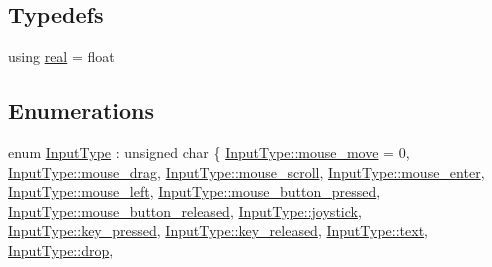 \subsection*{Typedefs}
\begin{DoxyCompactItemize}
\item 
using \mbox{\hyperlink{namespacengl_adada767537188ac7e090781732167146}{real}} = float
\end{DoxyCompactItemize}
\subsection*{Enumerations}
\begin{DoxyCompactItemize}
\item 
enum \mbox{\hyperlink{namespacengl_a5b20ff50635da5e3adb6bec00c062497}{Input\+Type}} \+: unsigned char \{ \newline
\mbox{\hyperlink{namespacengl_a5b20ff50635da5e3adb6bec00c062497a03f85558f24cc469dac5df2fdc8fd117}{Input\+Type\+::mouse\+\_\+move}} = 0, 
\mbox{\hyperlink{namespacengl_a5b20ff50635da5e3adb6bec00c062497a0442427b92526e865f90827173e346a0}{Input\+Type\+::mouse\+\_\+drag}}, 
\mbox{\hyperlink{namespacengl_a5b20ff50635da5e3adb6bec00c062497a6fda8ddfe16d2314d571fd69f5d5e9ff}{Input\+Type\+::mouse\+\_\+scroll}}, 
\mbox{\hyperlink{namespacengl_a5b20ff50635da5e3adb6bec00c062497a41bc07e96e66c3decc6bcb84741efbd2}{Input\+Type\+::mouse\+\_\+enter}}, 
\newline
\mbox{\hyperlink{namespacengl_a5b20ff50635da5e3adb6bec00c062497a88ad28b301ac29cf34aa69a9ff8dd4c8}{Input\+Type\+::mouse\+\_\+left}}, 
\mbox{\hyperlink{namespacengl_a5b20ff50635da5e3adb6bec00c062497a8285417800ef72bf8102466fe9e71cff}{Input\+Type\+::mouse\+\_\+button\+\_\+pressed}}, 
\mbox{\hyperlink{namespacengl_a5b20ff50635da5e3adb6bec00c062497aacdcff0ecfa7718eae6d7a9cb79f060d}{Input\+Type\+::mouse\+\_\+button\+\_\+released}}, 
\mbox{\hyperlink{namespacengl_a5b20ff50635da5e3adb6bec00c062497a2ed69833bf8cb33c80eaf0daa892400e}{Input\+Type\+::joystick}}, 
\newline
\mbox{\hyperlink{namespacengl_a5b20ff50635da5e3adb6bec00c062497ae394504187ed264fde32ad8f24ad7fba}{Input\+Type\+::key\+\_\+pressed}}, 
\mbox{\hyperlink{namespacengl_a5b20ff50635da5e3adb6bec00c062497a54b6fde34ab4a8893fdd008d95331436}{Input\+Type\+::key\+\_\+released}}, 
\mbox{\hyperlink{namespacengl_a5b20ff50635da5e3adb6bec00c062497a1cb251ec0d568de6a929b520c4aed8d1}{Input\+Type\+::text}}, 
\mbox{\hyperlink{namespacengl_a5b20ff50635da5e3adb6bec00c062497a6e9d25362c485bc3c90c818dfac5dc49}{Input\+Type\+::drop}}, 

\end{DoxyCompactItemize}
